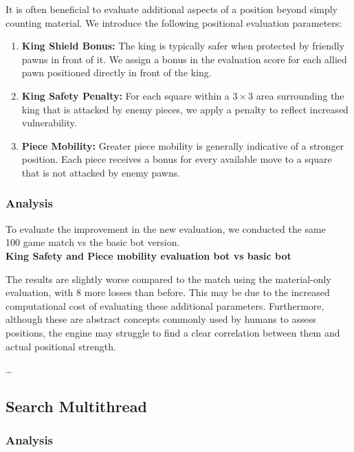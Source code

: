 It is often beneficial to evaluate additional aspects of a position beyond simply counting material. We introduce the following positional evaluation parameters:

\begin{enumerate}
    \item \textbf{King Shield Bonus:} The king is typically safer when protected by friendly pawns in front of it. We assign a bonus in the evaluation score for each allied pawn positioned directly in front of the king.

    \item \textbf{King Safety Penalty:} For each square within a $3 \times 3$ area surrounding the king that is attacked by enemy pieces, we apply a penalty to reflect increased vulnerability.

    \item \textbf{Piece Mobility:} Greater piece mobility is generally indicative of a stronger position. Each piece receives a bonus for every available move to a square that is not attacked by enemy pawns.
\end{enumerate}


\subsubsection{Analysis}

To evaluate the improvement in the new evaluation, we conducted the same\\
100 game match vs the basic bot version.\\ 

\textbf{King Safety and Piece mobility evaluation bot vs basic bot}\\
\medskip

The results are slightly worse compared to the match using the material-only evaluation, with 8 more losses than before. This may be due to the increased computational cost of evaluating these additional parameters. Furthermore, although these are abstract concepts commonly used by humans to assess positions, the engine may struggle to find a clear correlation between them and actual positional strength.

\ldots

\subsection{Search Multithread}

\subsubsection{Analysis}

